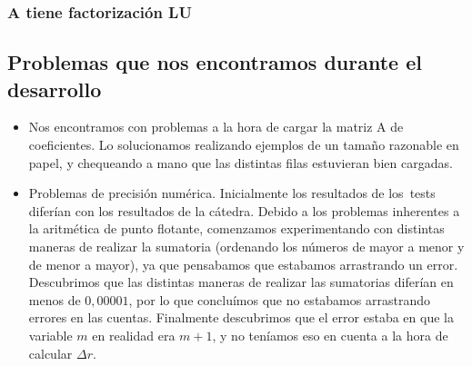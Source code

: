
\subsubsection{A tiene factorización LU}


\subsection{Problemas que nos encontramos durante el desarrollo}

\begin{itemize}
\item Nos encontramos con problemas a la hora de cargar la matriz A de coeficientes. Lo solucionamos realizando ejemplos de un tamaño razonable en papel, y chequeando a mano que las distintas filas estuvieran bien cargadas.

\item Problemas de precisión numérica. Inicialmente los resultados de los\ tests diferían con los resultados de la cátedra. Debido a los problemas inherentes a la aritmética de punto flotante, comenzamos experimentando con distintas maneras de realizar la sumatoria (ordenando los números de mayor a menor y de menor a mayor), ya que pensabamos que estabamos arrastrando un error. Descubrimos que las distintas maneras de realizar las sumatorias diferían en menos de $0,00001$, por lo que concluímos que no estabamos arrastrando errores en las cuentas. Finalmente descubrimos que el error estaba en que la variable $m$ en realidad era $m+1$, y no teníamos eso en cuenta a la hora de calcular $\Delta r$.

\end{itemize}
